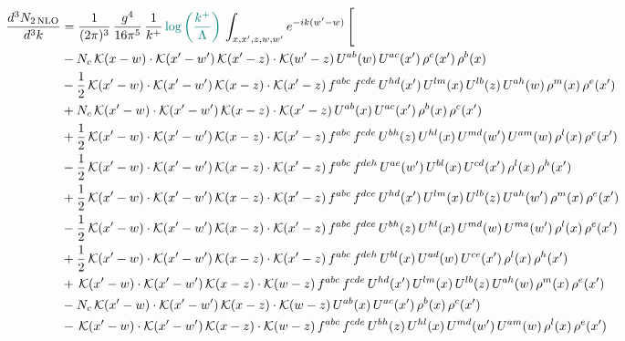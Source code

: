\documentclass[9pt]{article}
\numberwithin{equation}{section}
\begin{document}
\begin{align}
\frac{d^{3}N_{2\,\mathrm{NLO}}}{d^{3}k} & = \frac{1}{(2\pi)^{3}}\,\frac{g^{4}}{16\pi^{5}}\,\frac{1}{k^{+}}\,{\color{teal}\log{\left(\frac{k^{+}}{\Lambda}\right)}}\,\int_{x,x',z,w,w'}e^{-ik(w'-w)}\,\Bigg[\notag\\ & -N_{c}\,\mathcal{K}(x-w)\cdot\mathcal{K}(x'-w')\,\mathcal{K}(x'-z)\cdot\mathcal{K}(w'-z)\,U^{ab}(w)\,U^{ac}(x')\,\rho^{c}(x')\,\rho^{b}(x)\notag\\
& -\frac{1}{2}\,\mathcal{K}(x'-w)\cdot\mathcal{K}(x'-w')\,\mathcal{K}(x-z)\cdot\mathcal{K}(x'-z)\,f^{abc}\,f^{cde}\,U^{hd}(x')\,U^{lm}(x)\,U^{lb}(z)\,U^{ah}(w)\,\rho^{m}(x)\,\rho^{e}(x')\notag\\
& +N_{c}\,\mathcal{K}(x'-w)\cdot\mathcal{K}(x'-w')\,\mathcal{K}(x-z)\cdot\mathcal{K}(x'-z)\,U^{ab}(x)\,U^{ac}(x')\,\rho^{b}(x)\,\rho^{c}(x')\notag\\
& +\frac{1}{2}\,\mathcal{K}(x'-w)\cdot\mathcal{K}(x'-w')\,\mathcal{K}(x-z)\cdot\mathcal{K}(x'-z)\,f^{abc}\,f^{cde}\,U^{bh}(z)\,U^{hl}(x)\,U^{md}(w')\,U^{am}(w)\,\rho^{l}(x)\,\rho^{e}(x')\notag\\
& -\frac{1}{2}\,\mathcal{K}(x'-w)\cdot\mathcal{K}(x'-w')\,\mathcal{K}(x-z)\cdot\mathcal{K}(x'-z)\,f^{abc}\,f^{deh}\,U^{ae}(w')\,U^{bl}(x)\,U^{cd}(x')\,\rho^{l}(x)\,\rho^{h}(x')\notag \\ & +\frac{1}{2}\,\mathcal{K}(x'-w)\cdot\mathcal{K}(x'-w')\,\mathcal{K}(x-z)\cdot\mathcal{K}(x'-z)\,f^{abc}\,f^{dce}\,U^{hd}(x')\,U^{lm}(x)\,U^{lb}(z)\,U^{ah}(w')\,\rho^{m}(x)\,\rho^{e}(x')\notag\\
& -\frac{1}{2}\,\mathcal{K}(x'-w)\cdot\mathcal{K}(x'-w')\,\mathcal{K}(x-z)\cdot\mathcal{K}(x'-z)\,f^{abc}\,f^{dce}\,U^{bh}(z)\,U^{hl}(x)\,U^{md}(w)\,U^{ma}(w')\,\rho^{l}(x)\,\rho^{e}(x')\notag\\
& +\frac{1}{2}\,\mathcal{K}(x'-w)\cdot\mathcal{K}(x'-w')\,\mathcal{K}(x-z)\cdot\mathcal{K}(x'-z)\,f^{abc}\,f^{deh}\,U^{bl}(x)\,U^{ad}(w)\,U^{ce}(x')\,\rho^{l}(x)\,\rho^{h}(x')\notag\\
& +\,\mathcal{K}(x'-w)\cdot\mathcal{K}(x'-w')\,\mathcal{K}(x-z)\cdot\mathcal{K}(w-z)\,f^{abc}\,f^{cde}\,U^{hd}(x')\,U^{lm}(x)\,U^{lb}(z)\,U^{ah}(w)\,\rho^{m}(x)\,\rho^{e}(x')\notag\\
& -N_{c}\,\mathcal{K}(x'-w)\cdot\mathcal{K}(x'-w')\,\mathcal{K}(x-z)\cdot\mathcal{K}(w-z)\,U^{ab}(x)\,U^{ac}(x')\,\rho^{b}(x)\,\rho^{c}(x')\notag\\
& -\,\mathcal{K}(x'-w)\cdot\mathcal{K}(x'-w')\,\mathcal{K}(x-z)\cdot\mathcal{K}(w-z)\,f^{abc}\,f^{cde}\,U^{bh}(z)\,U^{hl}(x)\,U^{md}(w')\,U^{am}(w)\,\rho^{l}(x)\,\rho^{e}(x')\notag\\

\end{align}
\end{document}
